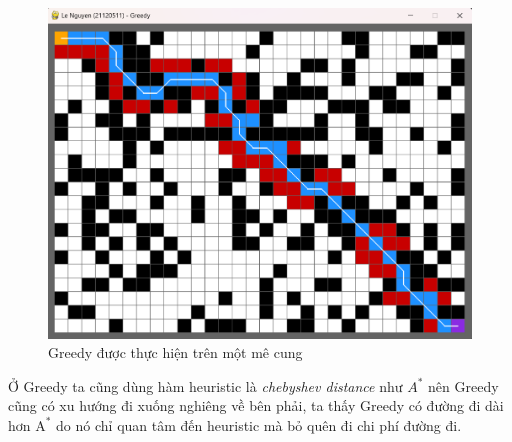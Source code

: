 \begin{figure}[H]
    \centering
    \includegraphics[scale=0.7]{figure/Implementation/Greedy.png}
    \caption{Greedy được thực hiện trên một mê cung}
    \label{fig:imple_Greedy}
\end{figure}

Ở Greedy ta cũng dùng hàm heuristic là \textit{chebyshev distance} như $A^*$ nên Greedy cũng có xu hướng đi xuống nghiêng về bên phải, ta thấy Greedy có đường đi dài hơn $\text{A}^*$ do nó chỉ quan tâm đến heuristic mà bỏ quên đi chi phí đường đi.